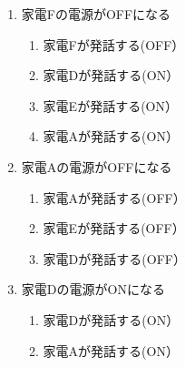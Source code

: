 \documentclass[a4j,12pt,twoside]{jreport}
\begin{document}
\begin{multicols}{2}
\begin{enumerate}
		\item 家電Fの電源がOFFになる
		\begin{enumerate}	
			\item 家電Fが発話する(OFF）
			\item 家電Dが発話する(ON）
			\item 家電Eが発話する(ON）
			\item 家電Aが発話する(ON）
		\end{enumerate}
		\item 家電Aの電源がOFFになる
		\begin{enumerate}
			\item 家電Aが発話する(OFF）
			\item 家電Eが発話する(OFF）
			\item 家電Dが発話する(OFF）
		\end{enumerate}
		
		\item 家電Dの電源がONになる
		\begin{enumerate}
			\item 家電Dが発話する(ON）
			\item 家電Aが発話する(ON）
		\end{enumerate}
	\end{enumerate}
\end{multicols}	
\end{document}
